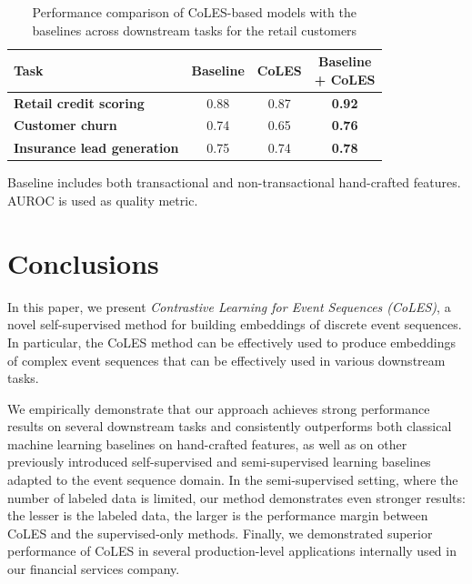 \documentclass[sigconf, anonymous]{acmart}
\begin{document}
\begin{table}
\centering
\caption{Performance comparison of CoLES-based models with the baselines across downstream tasks for the retail customers}
\begin{tabularx}{\linewidth}{Xccc}
\toprule
\textbf{Task } & \textbf{Baseline} & \textbf{CoLES} & \makecell{\textbf{Baseline}\\\textbf{+ CoLES}} \\
\midrule
\textbf{Retail credit scoring} & 0.88 & 0.87 & \textbf{0.92} \\
\textbf{Customer churn} & 0.74 & 0.65 & \textbf{0.76} \\
\textbf{Insurance lead generation} & 0.75 & 0.74 & \textbf{0.78} \\ %
\bottomrule
\end{tabularx}

\small{Baseline includes both transactional and non-transactional hand-crafted features. AUROC is used as quality metric.}
\label{tab-internal-person}
\end{table}


\section{Conclusions} \label{sec-conclusions}

In this paper, we present \emph{Contrastive Learning for Event Sequences (CoLES)}, a novel self-supervised method for building embeddings of discrete event sequences.
In particular, the CoLES method can be effectively
used to produce embeddings of complex event sequences that can be effectively used in various downstream tasks.

We empirically demonstrate that our approach achieves strong performance results on several downstream tasks and consistently outperforms both classical machine learning baselines on hand-crafted features, as well as on other  previously introduced  self-supervised and semi-supervised learning baselines adapted to the event sequence domain.
In the semi-supervised setting, where the number of labeled data is limited, our method demonstrates even stronger results: the lesser is the labeled data, the larger is the performance margin between CoLES and the supervised-only methods.
Finally, we demonstrated superior performance of CoLES in several production-level applications internally used in our financial services company.
\end{document}
